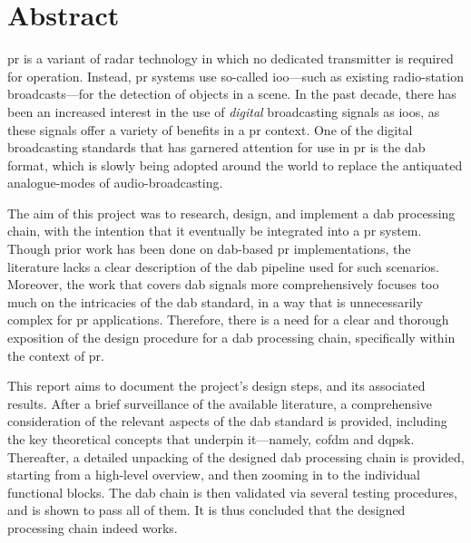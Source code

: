 \documentclass[class=report,11pt,crop=false]{standalone}
\begin{document}
\chapter*{Abstract}

\gls{pr} is a variant of radar technology in which no dedicated transmitter is required for operation. Instead, \gls{pr} systems use so-called \gls{ioo}---such as existing radio-station broadcasts---for the detection of objects in a scene. In the past decade, there has been an increased interest in the use of \emph{digital} broadcasting signals as \gls{ioo}s, as these signals offer a variety of benefits in a \gls{pr} context. One of the digital broadcasting standards that has garnered attention for use in \gls{pr} is the \gls{dab} format, which is slowly being adopted around the world to replace the antiquated analogue-modes of audio-broadcasting.

The aim of this project was to research, design, and implement a \gls{dab} processing chain, with the intention that it eventually be integrated into a \gls{pr} system. Though prior work has been done on \gls{dab}-based \gls{pr} implementations, the literature lacks a clear description of the \gls{dab} pipeline used for such scenarios. Moreover, the work that covers \gls{dab} signals more comprehensively focuses too much on the intricacies of the \gls{dab} standard, in a way that is unnecessarily complex for \gls{pr} applications. Therefore, there is a need for a clear and thorough exposition of the design procedure for a \gls{dab} processing chain, specifically within the context of \gls{pr}.

This report aims to document the project's design steps, and its associated results. After a brief surveillance of the available literature, a comprehensive consideration of the relevant aspects of the \gls{dab} standard is provided, including the key theoretical concepts that underpin it---namely, \gls{cofdm} and \gls{dqpsk}. Thereafter, a detailed unpacking of the designed \gls{dab} processing chain is provided, starting from a high-level overview, and then zooming in to the individual functional blocks. The \gls{dab} chain is then validated via several testing procedures, and is shown to pass all of them. It is thus concluded that the designed processing chain indeed works.

\ifstandalone
% 
\fi
\end{document}
